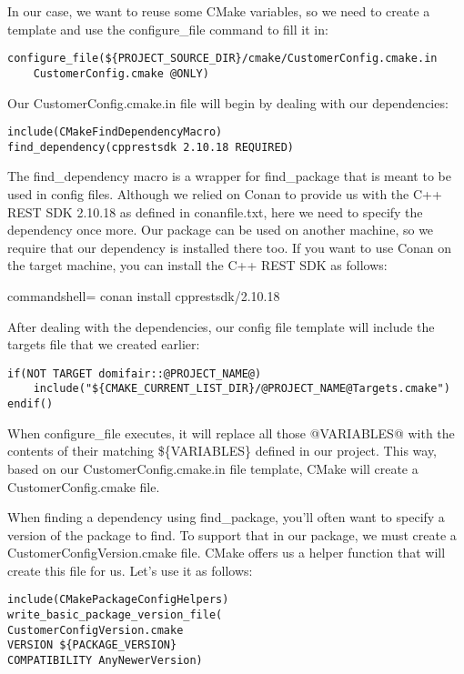 In our case, we want to reuse some CMake variables, so we need to create a template and use the configure\_file command to fill it in:

\begin{lstlisting}[style=styleCMake]
configure_file(${PROJECT_SOURCE_DIR}/cmake/CustomerConfig.cmake.in
	CustomerConfig.cmake @ONLY)
\end{lstlisting}

Our CustomerConfig.cmake.in file will begin by dealing with our dependencies:

\begin{lstlisting}[style=styleCMake]
include(CMakeFindDependencyMacro)
find_dependency(cpprestsdk 2.10.18 REQUIRED)
\end{lstlisting}

The find\_dependency macro is a wrapper for find\_package that is meant to be used in config files. Although we relied on Conan to provide us with the C++ REST SDK 2.10.18 as defined in conanfile.txt, here we need to specify the dependency once more. Our package can be used on another machine, so we require that our dependency is installed there too. If you want to use Conan on the target machine, you can install the C++ REST SDK as follows:

\begin{tcblisting}{commandshell={}}
conan install cpprestsdk/2.10.18
\end{tcblisting}

After dealing with the dependencies, our config file template will include the targets file that we created earlier:

\begin{lstlisting}[style=styleCMake]
if(NOT TARGET domifair::@PROJECT_NAME@)
	include("${CMAKE_CURRENT_LIST_DIR}/@PROJECT_NAME@Targets.cmake")
endif()
\end{lstlisting}

When configure\_file executes, it will replace all those @VARIABLES@ with the contents of their matching \$\{VARIABLES\} defined in our project. This way, based on our CustomerConfig.cmake.in file template, CMake will create a CustomerConfig.cmake file.

When finding a dependency using find\_package, you'll often want to specify a version of the package to find. To support that in our package, we must create a CustomerConfigVersion.cmake file. CMake offers us a helper function that will create this file for us. Let's use it as follows:

\begin{lstlisting}[style=styleCMake]
include(CMakePackageConfigHelpers)
write_basic_package_version_file(
CustomerConfigVersion.cmake
VERSION ${PACKAGE_VERSION}
COMPATIBILITY AnyNewerVersion)
\end{lstlisting}

